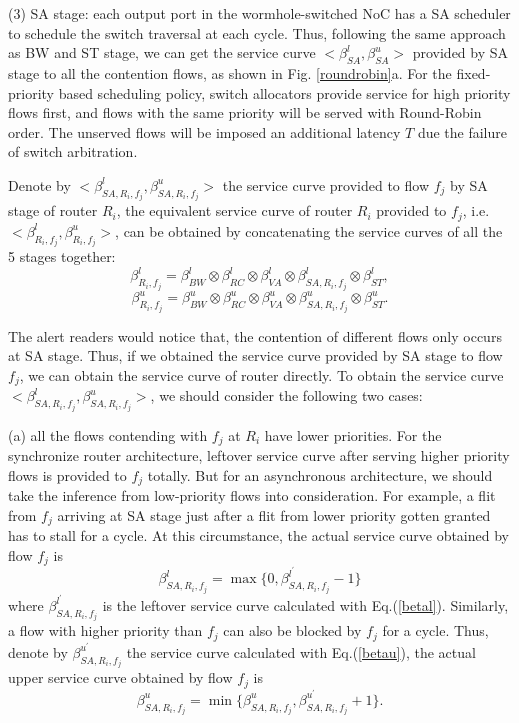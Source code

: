 \documentclass[10pt,journal]{IEEEtran}
\begin{document}
(3) SA stage: each output port in the wormhole-switched NoC has a SA scheduler to schedule the switch traversal at each cycle. Thus, following the same approach as BW and ST stage, we can get the service curve $<\beta_{SA}^l,\beta_{SA}^u>$ provided by SA stage to all the contention flows, as shown in Fig. \ref{roundrobin}a. For the fixed-priority based scheduling policy, switch allocators provide service for high priority flows first, and flows with the same priority will be served with Round-Robin order. The unserved flows will be imposed an additional latency $T$ due the failure of switch arbitration.

Denote by $<\beta_{SA,R_i,f_j}^l,\beta_{SA,R_i,f_j}^u>$ the service curve provided to flow $f_j$ by SA stage of router $R_i$, the equivalent service curve of router $R_i$ provided to $f_j$, i.e. $<\beta_{R_i,f_j}^l,\beta_{R_i,f_j}^u>$, can be obtained by concatenating the service curves of all the 5 stages together:
$$\beta_{R_i,f_j}^l=\beta_{BW}^l\otimes\beta_{RC}^l\otimes\beta_{VA}^l\otimes\beta_{SA,R_i,f_j}^l\otimes \beta_{ST}^l,$$
$$\beta_{R_i,f_j}^u=\beta_{BW}^u\otimes\beta_{RC}^u\otimes\beta_{VA}^u\otimes\beta_{SA,R_i,f_j}^u\otimes \beta_{ST}^u.$$

The alert readers would notice that, the contention of different flows only occurs at SA stage. Thus, if we obtained the service curve provided by SA stage to flow $f_j$, we can obtain the service curve of router directly. To obtain the service curve $<\beta_{SA,R_i,f_j}^l,\beta_{SA,R_i,f_j}^u>$, we should consider the following two cases:

(a) all the flows contending with $f_j$ at $R_i$ have lower priorities. For the synchronize router architecture, leftover service curve after serving higher priority flows is provided to $f_j$ totally. But for an asynchronous architecture, we should take the inference from low-priority flows into consideration. For example, a flit from $f_j$ arriving at SA stage just after a flit from lower priority gotten granted has to stall for a cycle. At this circumstance, the actual service curve obtained by flow $f_j$ is
\begin{equation}\label{nonpreemptbetal}
\beta^{l}_{SA,R_i,f_j}=\max\{0,\beta^{l^\prime}_{SA,R_i,f_j}-1\}
\end{equation}
where $\beta^{l^\prime}_{SA,R_i,f_j}$ is the leftover service curve calculated with Eq.(\ref{betal}). Similarly, a flow with higher priority than $f_j$ can also be blocked by $f_j$ for a cycle. Thus, denote by $\beta^{u^\prime}_{SA,R_i,f_j}$ the service curve calculated with Eq.(\ref{betau}), the actual upper service curve obtained by flow $f_j$ is
\begin{equation}\label{nonpreemptbetau}
\beta^{u}_{SA,R_i,f_j}=\min\{\beta^{u}_{SA,R_i,f_j},\beta^{u^\prime}_{SA,R_i,f_j}+1\}.
\end{equation}
\end{document}
